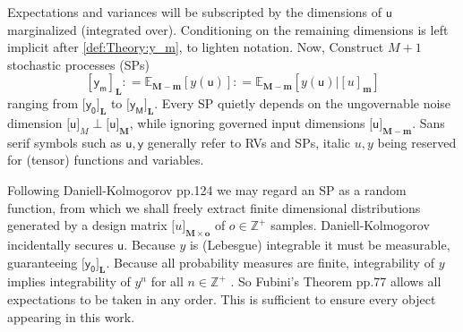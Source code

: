\documentclass[preprint,12pt]{elsarticle}
\newcommand*{\M}[1]{\ensuremath{#1}\xspace}
\newcommand*{\x}{\times}
\newcommand*{\mi}[1]{\mathbf{#1}}
\newcommand*{\st}[1]{\mathbb{#1}}
\newcommand*{\rv}[1]{\mathsf{#1}}
\newcommand*{\te}[2][]{\left\lbrack{#2}\right\rbrack_{#1}}
\newcommand*{\tte}[2][]{\lbrack{#2}\rbrack_{#1}}
\newcommand*{\deq}{\M{\mathrel{\mathop:}=}}
\newcommand*{\ev}[3][]{\mathbb{E}_{#3}^{#1}\!\left\lbrack{#2}\right\rbrack}
\begin{document}
    Expectations and variances will be subscripted by the dimensions of $\rv{u}$ marginalized (integrated over). Conditioning on the remaining dimensions is left implicit after \cref{def:Theory:y_m}, to lighten notation.
    Now, Construct $M+1$ stochastic processes (SPs)
    \begin{equation}\label{def:Theory:y_m}
        \te[\mi{L}]{\rv{y_m}} \deq \ev{y(\rv{u})}{\mi{M-m}} \deq \ev{y(\rv{u}) \big\vert \te[\mi{m}]{u}}{\mi{M-m}}
    \end{equation}
    ranging from $\tte[\mi{L}]{\rv{y_0}}$ to $\tte[\mi{L}]{\rv{y_M}}$. Every SP quietly depends on the ungovernable noise dimension $\tte[M]{\rv{u}} \perp \tte[\mi{M}]{\rv{u}}$, while ignoring governed input dimensions $\tte[\mi{M-m}]{\rv{u}}$. 
    Sans serif symbols such as $\rv{u,y}$ generally refer to RVs and SPs, italic $u,y$ being reserved for (tensor) functions and variables.
    
    Following Daniell-Kolmogorov \cite{Rogers.Williams2000} pp.124 we may regard an SP as a random function, from which we shall freely extract finite dimensional distributions generated by a design matrix $\tte[\mi{M\x o}]{u}$ of $o \in \st{Z}^{+}$ samples.
    Daniell-Kolmogorov incidentally secures $\rv{u}$. 
    Because $y$ is (Lebesgue) integrable it must be measurable, guaranteeing $\tte[\mi{L}]{\rv{y_0}}$.
    Because all probability measures are finite, integrability of $y$ implies integrability of $y^n$ for all $n \in \st{Z}^{+}$ \cite{Villani1985}. 
    So Fubini's Theorem \cite{Williams1991} pp.77 allows all expectations to be taken in any order. 
    This is sufficient to ensure every object appearing in this work.
\end{document}
